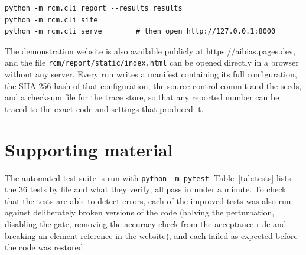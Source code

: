\begin{verbatim}
python -m rcm.cli report --results results
python -m rcm.cli site
python -m rcm.cli serve        # then open http://127.0.0.1:8000
\end{verbatim}

The demonstration website is also available publicly at \url{https://aibias.pages.dev}, and the file \nolinkurl{rcm/report/static/index.html} can be opened directly in a browser without any server. Every run writes a manifest containing its full configuration, the SHA-256 hash of that configuration, the source-control commit and the seeds, and a checksum file for the trace store, so that any reported number can be traced to the exact code and settings that produced it.

\section{Supporting material}
The automated test suite is run with \texttt{python -m pytest}. Table~\ref{tab:tests} lists the 36 tests by file and what they verify; all pass in under a minute. To check that the tests are able to detect errors, each of the improved tests was also run against deliberately broken versions of the code (halving the perturbation, disabling the gate, removing the accuracy check from the acceptance rule and breaking an element reference in the website), and each failed as expected before the code was restored.

